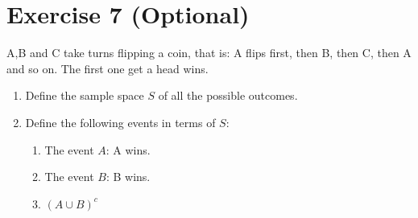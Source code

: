 \documentclass[12pt,thmsa]{article}\usepackage[]{graphicx}\usepackage[]{color}
\begin{document}
\section*{Exercise 7 (Optional)}

A,B and C take turns flipping a coin, that is: A flips first, then B, then C, then A and so on. The first one get a head wins.
\begin{enumerate}
  \item Define the sample space $S$ of all the possible outcomes.
  \item Define the following events in terms of $S$:
\begin{enumerate}
  \item The event $A$: A wins.
  \item The event $B$: B wins.
  \item $(A \cup B)^c$
\end{enumerate}
\end{enumerate}

\end{document}

